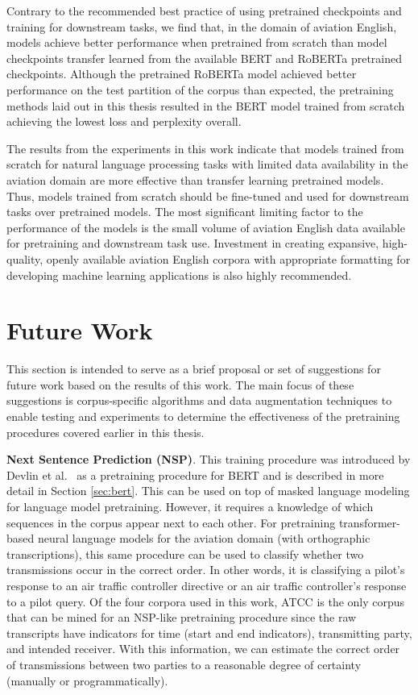 \documentclass[12pt]{article}
\begin{document}
Contrary to the recommended best practice of using pretrained checkpoints and training for downstream tasks, we find that, in the domain of aviation English, models achieve better performance when pretrained from scratch than model checkpoints transfer learned from the available BERT and RoBERTa pretrained checkpoints. Although the pretrained RoBERTa model achieved better performance on the test partition of the corpus than expected, the pretraining methods laid out in this thesis resulted in the BERT model trained from scratch achieving the lowest loss and perplexity overall.

The results from the experiments in this work indicate that models trained from scratch for natural language processing tasks with limited data availability in the aviation domain are more effective than transfer learning pretrained models. Thus, models trained from scratch should be fine-tuned and used for downstream tasks over pretrained models. The most significant limiting factor to the performance of the models is the small volume of aviation English data available for pretraining and downstream task use. Investment in creating expansive, high-quality, openly available aviation English corpora with appropriate formatting for developing machine learning applications is also highly recommended.

\section{Future Work}\label{sec:future_work}
This section is intended to serve as a brief proposal or set of suggestions for future work based on the results of this work. The main focus of these suggestions is corpus-specific algorithms and data augmentation techniques to enable testing and experiments to determine the effectiveness of the pretraining procedures covered earlier in this thesis.

\textbf{Next Sentence Prediction (NSP)}. This training procedure was introduced by Devlin et al.~\cite{devlin_bert_2019} as a pretraining procedure for BERT and is described in more detail in Section \ref{sec:bert}. This can be used on top of masked language modeling for language model pretraining. However, it requires a knowledge of which sequences in the corpus appear next to each other. For pretraining transformer-based neural language models for the aviation domain (with orthographic transcriptions), this same procedure can be used to classify whether two transmissions occur in the correct order. In other words, it is classifying a pilot's response to an air traffic controller directive or an air traffic controller's response to a pilot query. Of the four corpora used in this work, ATCC is the only corpus that can be mined for an NSP-like pretraining procedure since the raw transcripts have indicators for time (start and end indicators), transmitting party, and intended receiver. With this information, we can estimate the correct order of transmissions between two parties to a reasonable degree of certainty (manually or programmatically).
\end{document}
